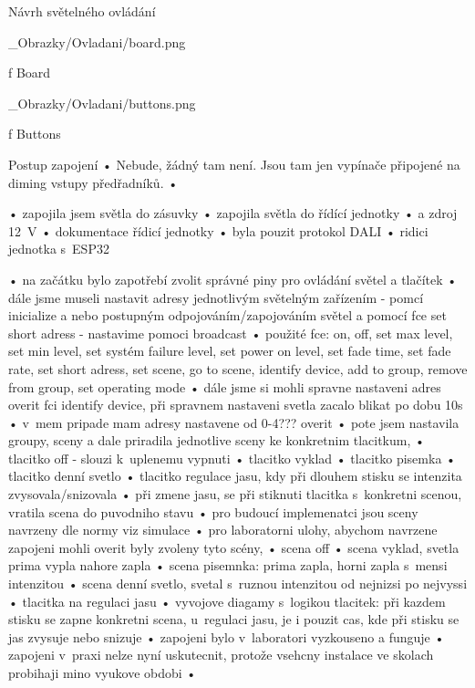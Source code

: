 \chap Návrh světelného ovládání

\medskip {}
\picw=10cm _Obrazky/Ovladani/board.png
\caption/f Board
\medskip

\medskip {}
\picw=15cm _Obrazky/Ovladani/buttons.png
\caption/f Buttons
\medskip





Postup zapojení
    • Nebude, žádný tam není. Jsou tam jen vypínače připojené na diming vstupy předřadníků.
    •

    • zapojila jsem světla do zásuvky
    • zapojila světla do řídící jednotky
    • a zdroj 12~V
    • dokumentace řídicí jednotky
    • byla pouzit protokol DALI
    • ridici jednotka s~ESP32

    • na začátku bylo zapotřebí zvolit správné piny pro ovládání světel a tlačítek
    • dále jsme museli nastavit adresy jednotlivým světelným zařízením - pomcí inicialize a nebo postupným odpojováním/zapojováním
        světel a pomocí fce set short adress - nastavime pomoci broadcast
    • použité fce: on, off, set max level, set min level, set systém failure level, set power on level, set fade time,
        set fade rate, set short adress, set scene, go to scene, identify device, add to group, remove from group,
        set operating mode
    • dále jsme si mohli spravne nastaveni adres overit fci identify device, při spravnem nastaveni svetla zacalo
        blikat po dobu 10s
    • v~mem pripade mam adresy nastavene od 0-4??? overit
    • pote jsem nastavila groupy, sceny a dale priradila jednotlive sceny ke konkretnim tlacitkum,
    • tlacitko off - slouzi k~uplenemu vypnuti
    • tlacitko vyklad
    • tlacitko pisemka
    • tlacitko denní svetlo
    • tlacitko regulace jasu, kdy při dlouhem stisku se intenzita zvysovala/snizovala
    • při zmene jasu, se při stiknuti tlacitka s~konkretni scenou, vratila scena do puvodniho stavu
    • pro budoucí implemenatci jsou sceny navrzeny dle normy viz simulace
    • pro laboratorni ulohy, abychom navrzene zapojeni mohli overit byly zvoleny tyto scény,
    • scena off
    • scena vyklad, svetla prima vypla nahore zapla
    • scena pisemnka: prima zapla, horni zapla s~mensi intenzitou
    • scena denní svetlo, svetal s~ruznou intenzitou od nejnizsi po nejvyssi
    • tlacitka na regulaci jasu
    • vyvojove diagamy s~logikou tlacitek: při kazdem stisku se zapne konkretni scena, u~regulaci jasu,
        je i pouzit cas, kde při stisku se jas zvysuje nebo snizuje
    • zapojeni bylo v~laboratori vyzkouseno a funguje
    • zapojeni v~praxi nelze nyní uskutecnit, protože vsehcny instalace ve skolach probihaji mino vyukove obdobi
    •


